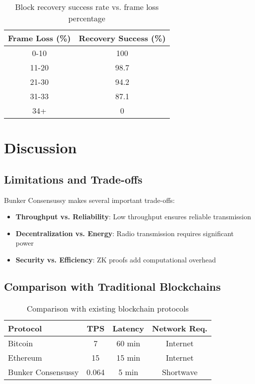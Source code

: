 \documentclass[11pt,a4paper]{article}
\begin{document}
\begin{table}[h]
\centering
\caption{Block recovery success rate vs. frame loss percentage}
\label{tab:error_correction}
\begin{tabular}{@{}cc@{}}
\toprule
Frame Loss (\%) & Recovery Success (\%) \\
\midrule
0-10 & 100 \\
11-20 & 98.7 \\
21-30 & 94.2 \\
31-33 & 87.1 \\
34+ & 0 \\
\bottomrule
\end{tabular}
\end{table}

\section{Discussion}

\subsection{Limitations and Trade-offs}

Bunker Consensussy makes several important trade-offs:

\begin{itemize}
\item \textbf{Throughput vs. Reliability}: Low throughput ensures reliable transmission
\item \textbf{Decentralization vs. Energy}: Radio transmission requires significant power
\item \textbf{Security vs. Efficiency}: ZK proofs add computational overhead
\end{itemize}

\subsection{Comparison with Traditional Blockchains}

\begin{table}[h]
\centering
\caption{Comparison with existing blockchain protocols}
\begin{tabular}{@{}lccc@{}}
\toprule
Protocol & TPS & Latency & Network Req. \\
\midrule
Bitcoin & 7 & 60 min & Internet \\
Ethereum & 15 & 15 min & Internet \\
Bunker Consensussy & 0.064 & 5 min & Shortwave \\
\bottomrule
\end{tabular}
\end{table}
\end{document}
